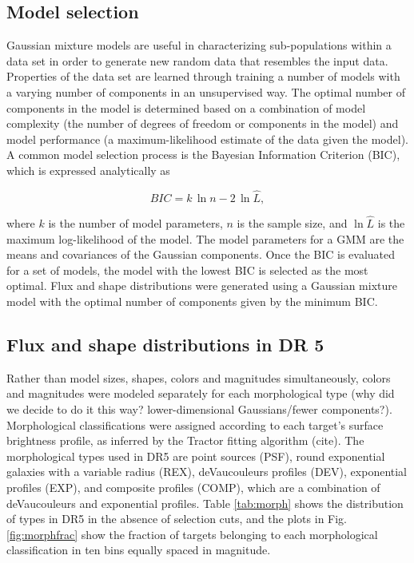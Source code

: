 \subsection{Model selection}

Gaussian mixture models are useful in characterizing sub-populations within a data set in order to generate new random data that resembles the input data. Properties of the data set are learned through training a number of models with a varying number of components in an unsupervised way. The optimal number of components in the model is determined based on a combination of model complexity (the number of degrees of freedom or components in the model) and model performance (a maximum-likelihood estimate of the data given the model). A common model selection process is the Bayesian Information Criterion (BIC), which is expressed analytically as

\begin{equation}
    BIC = k\,\ln{n} - 2\,\ln\hat{L},
\end{equation}

where $k$ is the number of model parameters, $n$ is the sample size, and $\ln\hat{L}$ is the maximum log-likelihood of the model. The model parameters for a GMM are the means and covariances of the Gaussian components. Once the BIC is evaluated for a set of models, the model with the lowest BIC is selected as the most optimal. Flux and shape distributions were generated using a Gaussian mixture model with the optimal number of components given by the minimum BIC. 

\subsection{Flux and shape distributions in DR 5}

 Rather than model sizes, shapes, colors and magnitudes simultaneously, colors and magnitudes were modeled separately for each morphological type (why did we decide to do it this way? lower-dimensional Gaussians/fewer components?). Morphological classifications were assigned according to each target's surface brightness profile, as inferred by the Tractor fitting algorithm (cite). The morphological types used in DR5 are point sources (PSF), round exponential galaxies with a variable radius (REX), deVaucouleurs profiles (DEV), exponential profiles (EXP), and composite profiles (COMP), which are a combination of deVaucouleurs and exponential profiles. Table \ref{tab:morph} shows the distribution of types in DR5 in the absence of selection cuts, and the plots in Fig. \ref{fig:morphfrac} show the fraction of targets belonging to each morphological classification in ten bins equally spaced in magnitude.

